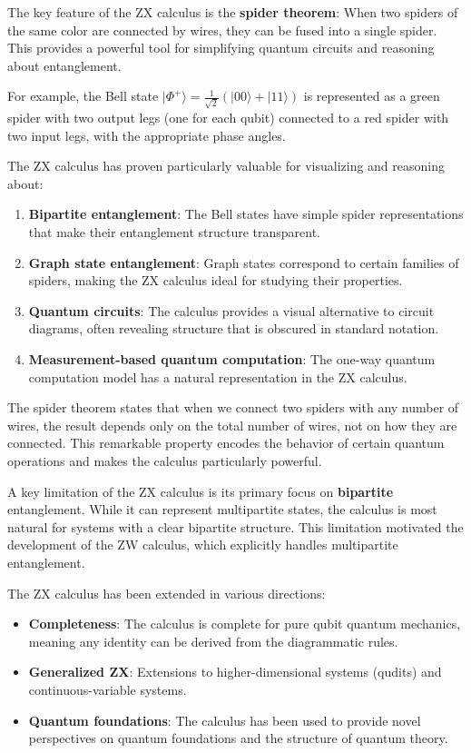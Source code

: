\documentclass[12pt,a4paper]{article}
\begin{document}
The key feature of the ZX calculus is the \textbf{spider theorem}: When two spiders of the same color are connected by wires, they can be fused into a single spider. This provides a powerful tool for simplifying quantum circuits and reasoning about entanglement.

For example, the Bell state $|\Phi^+\rangle = \frac{1}{\sqrt{2}}(|00\rangle + |11\rangle)$ is represented as a green spider with two output legs (one for each qubit) connected to a red spider with two input legs, with the appropriate phase angles.

The ZX calculus has proven particularly valuable for visualizing and reasoning about:
\begin{enumerate}
	\item \textbf{Bipartite entanglement}: The Bell states have simple spider representations that make their entanglement structure transparent.
	\item \textbf{Graph state entanglement}: Graph states correspond to certain families of spiders, making the ZX calculus ideal for studying their properties.
	\item \textbf{Quantum circuits}: The calculus provides a visual alternative to circuit diagrams, often revealing structure that is obscured in standard notation.
	\item \textbf{Measurement-based quantum computation}: The one-way quantum computation model has a natural representation in the ZX calculus.
\end{enumerate}

The spider theorem states that when we connect two spiders with any number of wires, the result depends only on the total number of wires, not on how they are connected. This remarkable property encodes the behavior of certain quantum operations and makes the calculus particularly powerful.

A key limitation of the ZX calculus is its primary focus on \textbf{bipartite} entanglement. While it can represent multipartite states, the calculus is most natural for systems with a clear bipartite structure. This limitation motivated the development of the ZW calculus, which explicitly handles multipartite entanglement.

The ZX calculus has been extended in various directions:
\begin{itemize}
	\item \textbf{Completeness}: The calculus is complete for pure qubit quantum mechanics, meaning any identity can be derived from the diagrammatic rules.
	\item \textbf{Generalized ZX}: Extensions to higher-dimensional systems (qudits) and continuous-variable systems.
	\item \textbf{Quantum foundations}: The calculus has been used to provide novel perspectives on quantum foundations and the structure of quantum theory.
\end{itemize}
\end{document}
